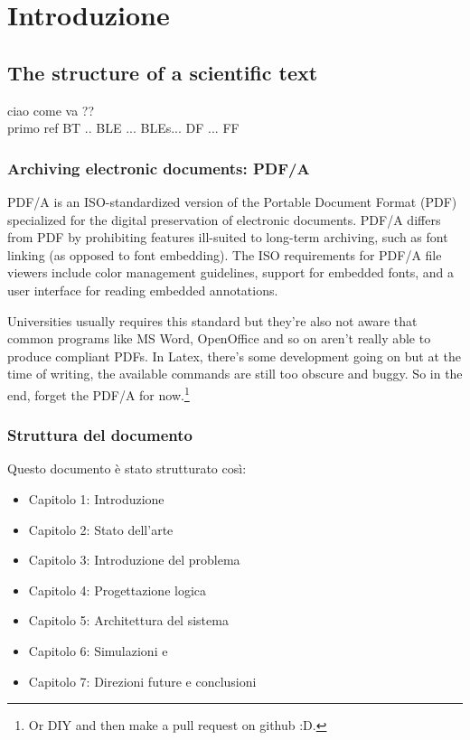 \chapter{Introduzione}
\label{chap:Introduzione}

\section{The structure of a scientific text}

ciao come va ??\\
primo ref \cite{ranganathan2010-pac}
\ac{BT} .. \acs{BLE} ... \acp{BLE}... \acf{DF} ... \acl{FF}

\subsection{Archiving electronic documents: PDF/A}
PDF/A is an ISO-standardized version of the Portable Document Format (PDF) specialized for the digital preservation of electronic documents. PDF/A differs from PDF by prohibiting features ill-suited to long-term archiving, such as font linking (as opposed to font embedding). The ISO requirements for PDF/A file viewers include color management guidelines, support for embedded fonts, and a user interface for reading embedded annotations.



Universities usually requires this standard but they're also not aware that common programs like MS Word, OpenOffice and so on aren't really able to produce compliant PDFs. In Latex, there's some development going on but at the time of writing, the available commands are still too obscure and buggy. So in the end, forget the PDF/A for now.\footnote{Or DIY and then make a pull request on github :D.}

\subsection{Struttura del documento}
Questo documento è stato strutturato così:
\begin{itemize}
	\item Capitolo 1: Introduzione
	\item Capitolo 2: Stato dell'arte
	\item Capitolo 3: Introduzione del problema
	\item Capitolo 4: Progettazione logica
	\item Capitolo 5: Architettura del sistema
	\item Capitolo 6: Simulazioni e 
	\item Capitolo 7: Direzioni future e conclusioni
\end{itemize}